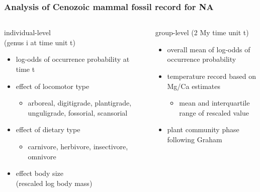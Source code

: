 \documentclass{beamer}
\begin{document}
\begin{frame}
  \frametitle{Analysis of Cenozoic mammal fossil record for NA}
  \begin{columns}
    \begin{column}{0.5\textwidth}
      individual-level \\(genus i at time unit t)
      \begin{itemize}
        \item log-odds of occurrence probability at time t
        \item effect of locomotor type
          \begin{itemize}
            \item arboreal, digitigrade, plantigrade, unguligrade, fossorial, scansorial
          \end{itemize}
        \item effect of dietary type
          \begin{itemize}
            \item carnivore, herbivore, insectivore, omnivore
          \end{itemize}
        \item effect body size \\(rescaled log body mass)
      \end{itemize}
    \end{column}
    \begin{column}{0.5\textwidth}
      group-level (2 My time unit t)
      \begin{itemize}
        \item overall mean of log-odds of occurrence probability
        \item temperature record based on Mg/Ca estimates
          \begin{itemize}
            \item mean and interquartile range of rescaled value
          \end{itemize}
        \item plant community phase following Graham
      \end{itemize}
    \end{column}
  \end{columns}
\end{frame}
\end{document}
